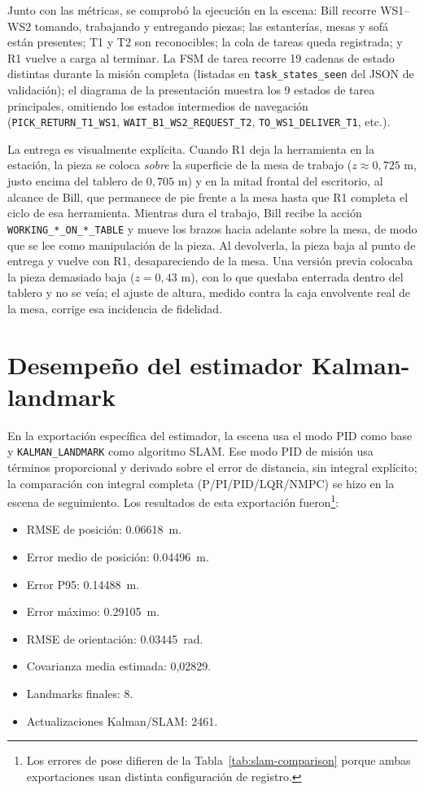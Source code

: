 Junto con las métricas, se comprobó la ejecución en la escena: Bill recorre
WS1--WS2 tomando, trabajando y entregando piezas; las estanterías, mesas y sofá
están presentes; T1 y T2 son reconocibles; la cola de tareas queda registrada;
y R1 vuelve a carga al terminar. La FSM de tarea recorre
19 cadenas de estado distintas durante la misión completa (listadas en
\texttt{task\_states\_seen} del JSON de validación); el diagrama de la presentación
muestra los 9 estados de tarea principales, omitiendo los estados intermedios de
navegación (\texttt{PICK\_RETURN\_T1\_WS1}, \texttt{WAIT\_B1\_WS2\_REQUEST\_T2},
\texttt{TO\_WS1\_DELIVER\_T1}, etc.).

La entrega es visualmente explícita. Cuando R1 deja la herramienta en la estación,
la pieza se coloca \emph{sobre} la superficie de la mesa de trabajo
(\(z\approx0{,}725\) m, justo encima del tablero de \(0{,}705\) m) y en la mitad
frontal del escritorio, al alcance de Bill, que permanece de pie frente a la mesa
hasta que R1 completa el ciclo de esa herramienta. Mientras dura el trabajo, Bill
recibe la acción \texttt{WORKING\_*\_ON\_*\_TABLE} y mueve los brazos hacia
adelante sobre la mesa, de modo que se lee como manipulación de la pieza. Al
devolverla, la pieza baja al punto de entrega y vuelve con R1, desapareciendo de
la mesa. Una versión previa colocaba la pieza demasiado baja (\(z=0{,}43\) m), con
lo que quedaba enterrada dentro del tablero y no se veía; el ajuste de altura, medido
contra la caja envolvente real de la mesa, corrige esa incidencia de fidelidad.

\section{Desempeño del estimador Kalman-landmark}

En la exportación específica del estimador, la escena usa el modo PID como base y
\texttt{KALMAN\_LANDMARK} como algoritmo SLAM. Ese modo PID de misión usa términos
proporcional y derivado sobre el error de distancia, sin integral explícito; la
comparación con integral completa (P/PI/PID/LQR/NMPC) se hizo en la escena de
seguimiento. Los resultados de esta exportación
fueron\footnote{Los errores de pose difieren de la Tabla~\ref{tab:slam-comparison}
porque ambas exportaciones usan distinta configuración de registro.}:

\begin{itemize}
  \item RMSE de posición: \SI{0.06618}{m}.
  \item Error medio de posición: \SI{0.04496}{m}.
  \item Error P95: \SI{0.14488}{m}.
  \item Error máximo: \SI{0.29105}{m}.
  \item RMSE de orientación: \SI{0.03445}{rad}.
  \item Covarianza media estimada: 0,02829.
  \item Landmarks finales: 8.
  \item Actualizaciones Kalman/SLAM: 2461.
\end{itemize}

